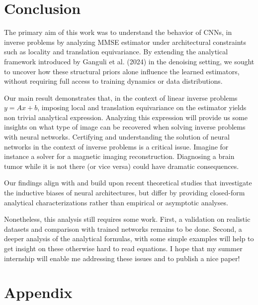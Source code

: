 \documentclass[a4paper,10pt]{article}
\theoremstyle{definition} %
\theoremstyle{definition} %
\theoremstyle{definition} %
\theoremstyle{definition} %
\newcommand{\0}{\boldsymbol{0}}
\newcommand{\X}{\mathcal{X}}
\newcommand{\Y}{\mathcal{Y}}
\newcommand{\Tx}{T^{\X}}
\newcommand{\Ty}{T^{\Y}}
\begin{document}

\section{Conclusion}
The primary aim of this work was to understand the behavior of CNNs, in inverse problems by analyzing MMSE estimator under architectural constraints such as locality and translation equivariance. By extending the analytical framework introduced by Ganguli et al. (2024) \cite{kamb2024analytictheorycreativityconvolutional} in the denoising setting, we sought to uncover how these structural priors alone influence the learned estimators, without requiring full access to training dynamics or data distributions.

Our main result demonstrates that, in the context of linear inverse problems $y=Ax+b$, imposing local and translation equivariance on the estimator yields non trivial analytical expression. 
Analyzing this expression will provide us some insights on what type of image can be recovered when solving inverse problems with neural networks. 
Certifying and understanding the solution of neural networks in the context of inverse problems is a critical issue. Imagine for instance a solver for a magnetic imaging reconstruction. 
Diagnosing a brain tumor while it is not there (or vice versa) could have dramatic consequences. 

Our findings align with and build upon recent theoretical studies that investigate the inductive biases of neural architectures, but differ by providing closed-form analytical characterizations rather than empirical or asymptotic analyses.

Nonetheless, this analysis still requires some work. First, a validation on realistic datasets and comparison with trained networks remains to be done. Second, a deeper analysis of the analytical formulas, with some simple examples will help to get insight on these otherwise hard to read equations. I hope that my summer internship will enable me addressing these issues and to publish a nice paper!

\section{Appendix}
\end{document}

